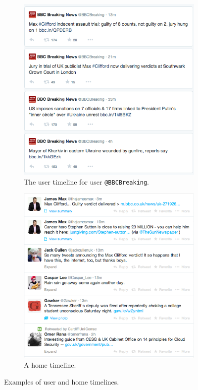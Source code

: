 \begin{figure}[h]
    \begin{subfigure}{.5\textwidth}
        \centering
        \includegraphics[scale=0.4]{2.Background/Media/user_timeline.png} 
        \caption{The user timeline for user \texttt{@BBCBreaking}.}
        \label{fig:user_timeline}
    \end{subfigure}
    \quad
    \begin{subfigure}{.5\textwidth}
         \centering
        \includegraphics[scale=0.42]{2.Background/Media/home_timeline.png} 
        \caption{A home timeline.}
        \label{fig:home_timeline}
    \end{subfigure}
    \label{fig:timelines}
    \caption{Examples of user and home timelines.}
\end{figure}


